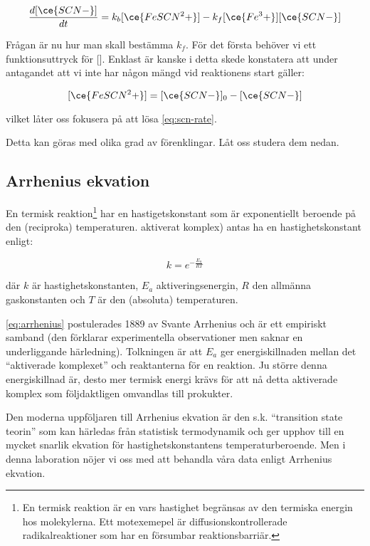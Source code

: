 \begin{equation}
  \label{eq:scn-rate}
  \frac{d[\ce{SCN-}]}{dt} = k_b[\ce{FeSCN^2+}] - k_f[\ce{Fe^3+}][\ce{SCN-}]
\end{equation}

Frågan är nu hur man skall bestämma $k_f$. För det första behöver vi ett funktionsuttryck
för []. Enklast är kanske i detta skede konstatera att under antagandet att
vi inte har någon mängd  vid reaktionens start gäller:

\begin{equation}
  \label{eq:fescn-scn-rel}
  [\ce{FeSCN^2+}] = [\ce{SCN-}]_0 - [\ce{SCN-}]
\end{equation}

vilket låter oss fokusera på att lösa \cref{eq:scn-rate}.

Detta kan göras med olika grad av förenklingar. Låt oss studera dem nedan.


\subsection{Arrhenius ekvation}
En termisk reaktion\footnote{En termisk reaktion är en vars hastighet begränsas av den termiska
energin hos molekylerna. Ett motexemepel är diffusionskontrollerade
radikalreaktioner som har en försumbar reaktionsbarriär.} har en
hastigetskonstant som är exponentiellt beroende på den (reciproka) temperaturen.
aktiverat komplex) antas ha en hastighetskonstant enligt:

\begin{equation}
  \label{eq:arrhenius}
  k = e^{-\frac{E_a}{RT}}
\end{equation}

där $k$ är hastighetskonstanten, $E_a$ aktiveringsenergin, $R$ den
allmänna gaskonstanten och $T$ är den (absoluta) temperaturen.

\cref{eq:arrhenius} postulerades 1889 av Svante Arrhenius och är ett
empiriskt samband (den förklarar experimentella observationer men saknar
en underliggande härledning). Tolkningen är att $E_a$ ger
energiskillnaden mellan det ``aktiverade komplexet'' och reaktanterna för
en reaktion. Ju större denna energiskillnad är, desto mer termisk energi
krävs för att nå detta aktiverade komplex som följdaktligen omvandlas
till prokukter.

Den moderna uppföljaren till Arrhenius ekvation är den s.k. ``transition
state teorin'' som kan härledas från statistisk termodynamik och ger
upphov till en mycket snarlik ekvation för hastighetskonstantens
temperaturberoende. Men i denna laboration nöjer vi oss med att behandla
våra data enligt Arrhenius ekvation.

